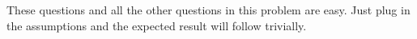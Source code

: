 
\begin{answer}
These questions and all the other questions in this problem are easy. Just plug in the assumptions and the expected result will follow trivially.

\end{answer}
